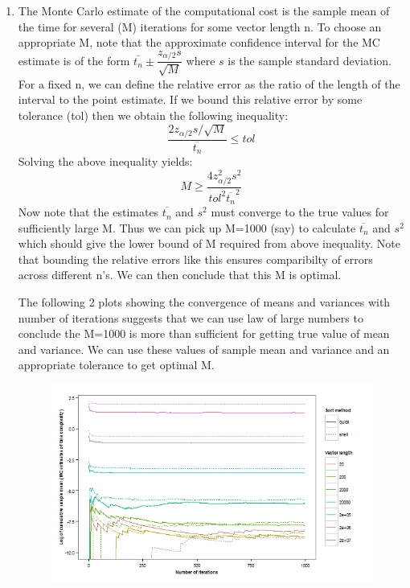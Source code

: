 \documentclass[12pt]{article}
\begin{document}
\begin{enumerate}[label=(\alph*)]
\item The Monte Carlo estimate of the computational cost is the sample mean of the time for several (M) iterations for some vector length n. To choose an appropriate M, note that the approximate confidence interval for the MC estimate is of the form $\overline{t_n}\pm\dfrac{z_{\alpha/2}s}{\sqrt{M}}$ where $s$ is the sample standard deviation. For a fixed n, we can define the relative error as the ratio of the length of the interval to the point estimate. If we bound this relative error by some tolerance (tol) then we obtain the following inequality:
\[\dfrac{2z_{\alpha/2}s/\sqrt{M}}{\overline{t_n}}\leq tol\]
Solving the above inequality yields:
\[M\geq\dfrac{4z_{\alpha/2}^{2}s^2}{tol^2\overline{t_n}^2}\]
Now note that the estimates $\overline{t_n}$ and $s^2$ must converge to the true values for sufficiently large M. Thus we can pick up M=1000 (say) to calculate $\overline{t_n}$ and $s^2$ which should give the lower bound of M required from above inequality. Note that bounding the relative errors like this ensures comparibilty of errors across different n's. We can then conclude that this M is optimal.

The following 2 plots showing the convergence of means and variances with number of iterations suggests that we can use law of large numbers to conclude the M=1000 is more than sufficient for getting true value of mean and variance. We can use these values of sample mean and variance and an appropriate tolerance to get optimal M. 

\begin{figure}[H]
\begin{centering}
\includegraphics[scale=1.5]{Fig1.jpeg}
\caption{}
\end{centering}
\end{figure}


\end{enumerate}
\end{document}
